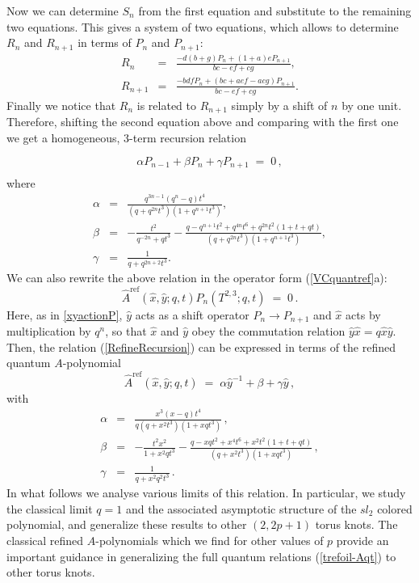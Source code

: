 \documentclass[hyper,letterpaper]{JHEP3}
\newcommand{\bea}{\begin{eqnarray}}
\newcommand{\eea}{\end{eqnarray}}
\newcommand{\be}{\begin{equation}}
\newcommand{\ee}{\end{equation}}
\renewcommand{\hat}{\widehat}
\begin{document}
Now we can determine $S_n$ from the first equation and substitute to the remaining two equations.
This gives a system of two equations, which allows to determine $R_n$ and $R_{n+1}$ in terms of $P_n$ and $P_{n+1}$:
\bea
R_n & = & \frac{-d(b+g) P_n + (1 + a) e P_{n+1}}{b c - e f + c g}, \\
R_{n+1}  & = & \frac{-b d f P_ n + (b c  + a e f - a c g) P_{n+1}}{b c - e f + c g}.
\eea
Finally we notice that $R_n$ is related to $R_{n+1}$ simply by a shift of $n$ by one unit.
Therefore, shifting the second equation above and comparing with the first one we get a homogeneous,
3-term recursion relation
\be
\boxed{\phantom{\int^1}
\alpha P_{n-1} + \beta P_n + \gamma P_{n+1} \; = \; 0 \,,
\phantom{\int^1}}
\label{RefineRecursion}
\ee
where
\bea
\alpha & = & \frac{q^{3 n-1} (q^n - q) t^4}{(q + q^{2 n} t^3) (1 +
   q^{n+1} t^3)}, \label{A}  \\
\beta & = & -\frac{t^2}{q^{-2 n} + q t^3} -
\frac{ q - q^{n+1} t^2 + q^{4 n} t^6 +
  q^{2 n} t^2 (1 + t + q t)}{(q + q^{2 n} t^3) (1 + q^{n+1} t^3)},  \label{B}  \\
\gamma & = & \frac{1}{q + q^{2 n+2} t^3} .   \label{C}
\eea
We can also rewrite the above relation in the operator form (\ref{VCquantref}a):
\be
\hat A^{\text{ref}} (\hat x, \hat y; q,t) P_n (T^{2,3};q,t) \; = \; 0 \,.
\ee
Here, as in \eqref{xyactionP}, $\hat{y}$ acts as a shift operator $P_n \to P_{n+1}$
and $\hat{x}$ acts by multiplication by $q^n$, so that $\hat x$ and $\hat y$ obey the commutation relation $\hat{y} \hat{x} = q \hat{x}\hat{y}$.
Then, the relation (\ref{RefineRecursion}) can be expressed in terms of the refined quantum $A$-polynomial
\be
\widehat{A}^{\text{ref}}(\hat{x},\hat{y};q,t) \; =  \; \alpha \hat{y}^{-1} + \beta + \gamma\hat{y} \,,   \label{trefoil-Aqt}
\ee
with
\bea
\alpha & = & \frac{x^3 (x - q) t^4}{q (q + x^2 t^3) (1 +
   x q t^3)} \,,   \\
\beta & = & -\frac{t^2 x^2}{1 + x^2 q t^3} -
\frac{ q - x q t^2 + x^{4} t^6 +
  x^{2} t^2 (1 + t + q t)}{(q + x^{2} t^3) (1 + x q t^3)} \,,    \\
\gamma & = & \frac{1}{q + x^2 q^{2} t^3} \,.
\eea
In what follows we analyse various limits of this relation.
In particular, we study the classical limit $q=1$ and the associated asymptotic structure of the $sl_2$ colored polynomial,
and generalize these results to other $(2,2p+1)$ torus knots.
The classical refined $A$-polynomials which we find for other values of $p$
provide an important guidance in generalizing the full quantum relations (\ref{trefoil-Aqt}) to other torus knots.
\end{document}
